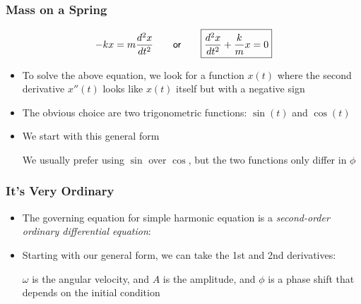 \documentclass[12pt,compress,aspectratio=169]{beamer}
\begin{document}
\begin{frame}
  \frametitle{Mass on a Spring}

  {\Large
    \begin{displaymath}
      -kx=m\frac{d^2x}{dt^2}\quad\quad\textsf{\normalsize or}\quad\quad
      \boxed{\frac{d^2x}{dt^2}+\frac{k}{m}x=0}
    \end{displaymath}
  }
  \begin{itemize}
  \item To solve the above equation, we look for a function $x(t)$ where the
    second derivative $x''(t)$ looks like $x(t)$ itself but with a negative sign
  \item The obvious choice are two trigonometric functions: $\sin(t)$ and
    $\cos(t)$
  \item<2-> We start with this general form
    
    \vspace{-0.3in}{\Large
      \begin{displaymath}
        x(t)=A\sin(\omega t+\phi)
      \end{displaymath}
    }

    \vspace{-0.2in}We usually prefer using $\sin$ over $\cos$, but the
    two functions only differ in $\phi$
  \end{itemize}
\end{frame}


\begin{frame}
  \frametitle{It's Very Ordinary}
  \begin{itemize}
  \item The governing equation for simple harmonic equation is a
    \emph{second-order ordinary differential equation}:

  \item Starting with our general form, we can take the 1st and 2nd derivatives:
 
    \vspace{-0.35in}{\Large
      \begin{align*}
        x(t)&=A\sin(\omega t+\phi)\\
        x'(t)&=A\omega\cos(\omega t+\phi)\\
        x''(t)&=-A\omega^2\sin(\omega t+\phi)=-\omega^2x
      \end{align*}
    }
    
    \vspace{-0.2in}$\omega$ is the angular velocity, and $A$ is the amplitude,
    and $\phi$ is a phase shift that depends on the initial condition
  \end{itemize}
\end{frame}
\end{document}
